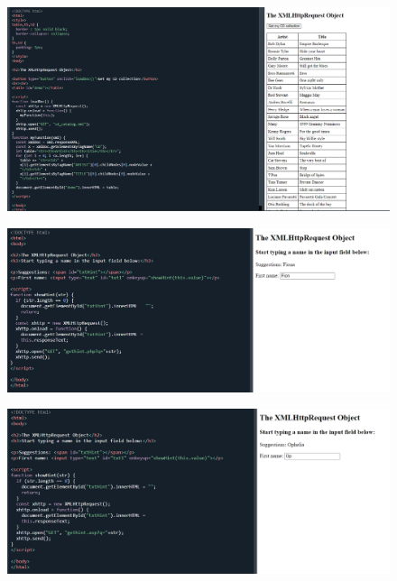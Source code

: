 \documentclass{article}
\begin{document}
\begin{itemize}
		\begin{figure}[H]
			\centering
			\includegraphics[width=1.0\textwidth,keepaspectratio]{img/F8.png}
		\end{figure}

		\begin{figure}[H]
			\centering
			\includegraphics[width=1.0\textwidth,keepaspectratio]{img/F9.png}
		\end{figure}

		\begin{figure}[H]
			\centering
			\includegraphics[width=1.0\textwidth,keepaspectratio]{img/F10.png}
		\end{figure}



\end{itemize}
\end{document}
